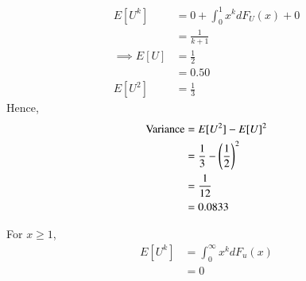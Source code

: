 \documentclass[journal,12pt,twocolumn]{IEEEtran}
\begin{document}
\begin{align}
    E[U^k] &=  0 + \int_{0}^{1} x^k dF_U(x) + 0 \\
                 &= \frac{1}{k + 1}  \\
    \implies E[U] &= \frac{1}{2}\\
                        &= 0.50\\
             E[U^2] &= \frac{1}{3}
\end{align}
Hence,
\begin{align}
    \text{Variance} &= E[U^2] - {{E[U]}}^2 \\
                    &= \frac{1}{3} - \left(\frac{1}{2}\right)^2 \\
                    &= \frac{1}{12} \\
                    &= 0.0833
\end{align}

For $x \ge 1$,
\begin{align}
    E[U^k]&=\int_{0}^{\infty} x^k dF_u(x)\\
    &=0
\end{align}
\end{document}
